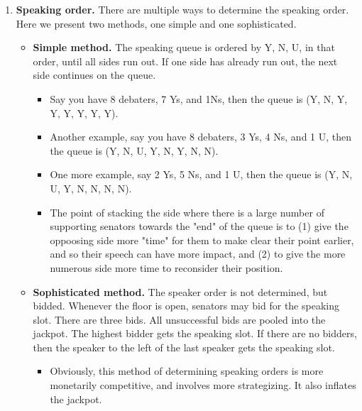 \begin{enumerate}
    \item \textbf{Speaking order.} There are multiple ways to determine the speaking order. Here we present two methods, one simple and one sophisticated. 
        \begin{itemize}
        \item \textbf{Simple method.} The speaking queue is ordered by Y, N, U, in that order, until all sides run out. If one side has already run out, the next side continues on the queue.
        \begin{itemize}
        \item  Say you have 8 debaters, 7 Ys, and 1Ns, then the queue is (Y, N, Y, Y, Y, Y, Y, Y).
        \item  Another example, say you have 8 debaters, 3 Ys, 4 Ns, and 1 U, then the queue is (Y, N, U, Y, N, Y, N, N). 
        \item One more example, say 2 Ys, 5 Ns, and 1 U, then the queue is (Y, N, U, Y, N, N, N, N).
        \item The point of stacking the side where there is a large number of supporting senators towards the "end" of the queue is to (1) give the oppoosing side more "time" for them to make clear their point earlier, and so their speech can have more impact, and (2) to give the more numerous side more time to reconsider their position. 
        \end{itemize}

        
        \item \textbf{Sophisticated method.} The speaker order is not determined, but bidded. Whenever the floor is open, senators may bid for the speaking slot. There are three bids. All unsuccessful bids are pooled into the jackpot. The highest bidder gets the speaking slot. If there are no bidders, then the speaker to the left of the last speaker gets the speaking slot. 
        \begin{itemize}
            \item Obviously, this method of determining speaking orders is more monetarily competitive, and involves more strategizing. It also inflates the jackpot.
        \end{itemize}
    \end{itemize}
    

\end{enumerate}
